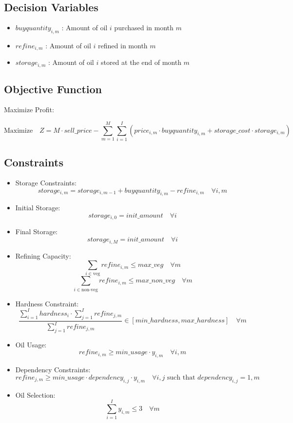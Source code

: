 \documentclass{article}
\begin{document}
\subsection*{Decision Variables}
\begin{itemize}
    \item \( buyquantity_{i,m} \) : Amount of oil \( i \) purchased in month \( m \)
    \item \( refine_{i,m} \) : Amount of oil \( i \) refined in month \( m \)
    \item \( storage_{i,m} \) : Amount of oil \( i \) stored at the end of month \( m \)
\end{itemize}

\subsection*{Objective Function}
Maximize Profit:

\[
\text{Maximize} \quad Z = M \cdot sell\_price - \sum_{m=1}^{M} \sum_{i=1}^{I} (price_{i,m} \cdot buyquantity_{i,m} + storage\_cost \cdot storage_{i,m})
\]

\subsection*{Constraints}

\begin{itemize}
    \item Storage Constraints:
    \[
    storage_{i,m} = storage_{i,m-1} + buyquantity_{i,m} - refine_{i,m} \quad \forall i, m
    \]
    
    \item Initial Storage:
    \[
    storage_{i,0} = init\_amount \quad \forall i
    \]

    \item Final Storage:
    \[
    storage_{i,M} = init\_amount \quad \forall i
    \]

    \item Refining Capacity:
    \[
    \sum_{i \in \text{veg}} refine_{i,m} \leq max\_veg \quad \forall m
    \]
    \[
    \sum_{i \in \text{non-veg}} refine_{i,m} \leq max\_non\_veg \quad \forall m
    \]

    \item Hardness Constraint:
    \[
    \frac{\sum_{i=1}^{I} hardness_{i} \cdot \sum_{j=1}^{I} refine_{j,m}}{\sum_{j=1}^{I} refine_{j,m}} \in [min\_hardness, max\_hardness] \quad \forall m
    \]

    \item Oil Usage:
    \[
    refine_{i,m} \geq min\_usage \cdot y_{i,m} \quad \forall i, m
    \]

    \item Dependency Constraints:
    \[
    refine_{j,m} \geq min\_usage \cdot dependency_{i,j} \cdot y_{i,m} \quad \forall i,j \text{ such that } dependency_{i,j}=1, m
    \]

    \item Oil Selection:
    \[
    \sum_{i=1}^{I} y_{i,m} \leq 3 \quad \forall m
    \]

\end{itemize}
\end{document}
